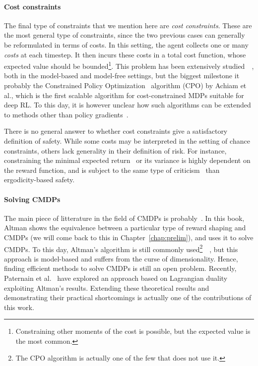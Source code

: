 		\paragraph{Cost constraints} The final type of constraints that we mention here are\emph{ cost constraints}. These are the most general type of constraints, since the two previous cases can generally be reformulated in terms of costs. In this setting, the agent collects one or many\emph{ costs} at each timestep. It then incurs these costs in a total cost function, whose expected value should be bounded\footnote{Constraining other moments of the cost is possible, but the expected value is the most common.}. This problem has been extensively studied~\cite{garcia2015comprehensive}~\cite{kim2012cost}, both in the model-based and model-free settings, but the biggest milestone it probably the Constrained Policy Optimization~\cite{achiam2017constrained} algorithm (CPO) by Achiam et al., which is the first scalable algorithm for cost-constrained MDPs suitable for deep RL. To this day, it is however unclear how such algorithms can be extended to methods other than policy gradients~\cite{chow2018lyapunov}. \par
		There is no general answer to whether cost constraints give a satisfactory definition of safety. While some costs may be interpreted in the setting of chance constraints, others lack generality in their definition of risk. For instance, constraining the minimal expected return~\cite{hans2008safe} or its variance is highly dependent on the reward function, and is subject to the same type of criticism~\cite{garcia2015comprehensive} than ergodicity-based safety.
		\paragraph{Solving CMDPs} The main piece of litterature in the field of CMDPs is probably~\cite{altman1999constrained}. In this book, Altman shows the equivalence between a particular type of reward shaping and CMDPs (we will come back to this in Chapter~\ref{chap:prelim}), and uses it to solve CMDPs. To this day, Altman's algorithm is still commonly used\footnote{The CPO algorithm is actually one of the few that does not use it.}~\cite{kim2012cost}~\cite{zheng2020constrained}, but this approach is model-based and suffers from the curse of dimensionality. Hence, finding efficient methods to solve CMDPs is still an open problem. Recently, Paternain et al.~\cite{paternain2019safe} have explored an approach based on Lagrangian duality exploiting Altman's results. Extending these theoretical results and demonstrating their practical shortcomings is actually one of the contributions of this work.
		

